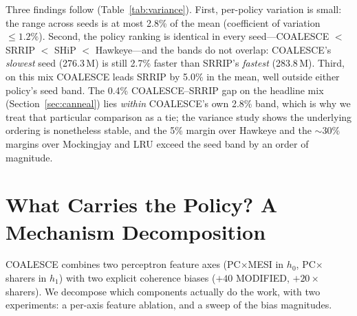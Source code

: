 \documentclass[conference]{IEEEtran}
\begin{document}
\begin{table}[tbp]
    \centering
    \renewcommand{\arraystretch}{1.15}
    \caption{Seed sensitivity: total cycles (millions) across three VMEM randomisation seeds (8-core canneal, fixed mix)}
    \label{tab:variance}
\end{table}

Three findings follow (Table~\ref{tab:variance}). First, per-policy variation is small: the range across seeds is at most 2.8\% of the mean (coefficient of variation $\leq 1.2\%$). Second, the policy ranking is identical in every seed---COALESCE $<$ SRRIP $<$ SHiP $<$ Hawkeye---and the bands do not overlap: COALESCE's \emph{slowest} seed (276.3\,M) is still 2.7\% faster than SRRIP's \emph{fastest} (283.8\,M). Third, on this mix COALESCE leads SRRIP by 5.0\% in the mean, well outside either policy's seed band. The 0.4\% COALESCE--SRRIP gap on the headline mix (Section~\ref{sec:canneal}) lies \emph{within} COALESCE's own 2.8\% band, which is why we treat that particular comparison as a tie; the variance study shows the underlying ordering is nonetheless stable, and the 5\% margin over Hawkeye and the ${\sim}30\%$ margins over Mockingjay and LRU exceed the seed band by an order of magnitude.

\section{What Carries the Policy? A Mechanism Decomposition}
\label{sec:ablation}

COALESCE combines two perceptron feature axes (PC$\times$MESI in $h_0$, PC$\times$sharers in $h_1$) with two explicit coherence biases ($+40$ MODIFIED, $+20\times$sharers). We decompose which components actually do the work, with two experiments: a per-axis feature ablation, and a sweep of the bias magnitudes.
\end{document}
